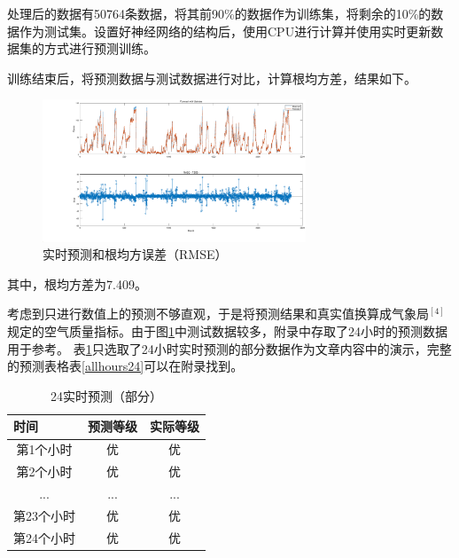 \documentclass[UTF8]{ctexart}
\begin{document}
处理后的数据有50764条数据，将其前90\%的数据作为训练集，将剩余的10\%的数据作为测试集。设置好神经网络的结构后，使用CPU进行计算并使用实时更新数据集的方式进行预测训练。

训练结束后，将预测数据与测试数据进行对比，计算根均方差，结果如下。
\begin{figure}[H] %
    \centering %
    \includegraphics[width=0.7\textwidth]{./picture/ForecasetWithUpdates.eps} %
    \caption{实时预测和根均方误差（RMSE）} 
    \label{LastingPre}
\end{figure}
其中，根均方差为7.409。

考虑到只进行数值上的预测不够直观，于是将预测结果和真实值换算成气象局$^{[4]}$规定的空气质量指标。由于图\ref{LastingPre}中测试数据较多，附录中存取了24小时的预测数据用于参考。
表\ref{hours24}只选取了24小时实时预测的部分数据作为文章内容中的演示，完整的预测表格表\ref{allhours24}可以在附录找到。

\begin{table}[H]
    \centering
    \begin{tabular}{|c|c|clll|}
    \hline
    \multicolumn{1}{|l|}{时间} & \multicolumn{1}{l|}{预测等级} & \multicolumn{4}{l|}{实际等级} \\ \hline
    第1个小时                     & 优                         & \multicolumn{4}{c|}{优}    \\ \hline
    第2个小时                    & 优                         & \multicolumn{4}{c|}{优}    \\ \hline
    ...                     & ...                         & \multicolumn{4}{c|}{...}    \\ \hline
    第23个小时                     & 优                         & \multicolumn{4}{c|}{优}    \\ \hline
    第24个小时                     & 优                         & \multicolumn{4}{c|}{优}    \\ \hline
    \end{tabular}
    \caption{24实时预测（部分）}
    \label{hours24}
\end{table}
\end{document}
